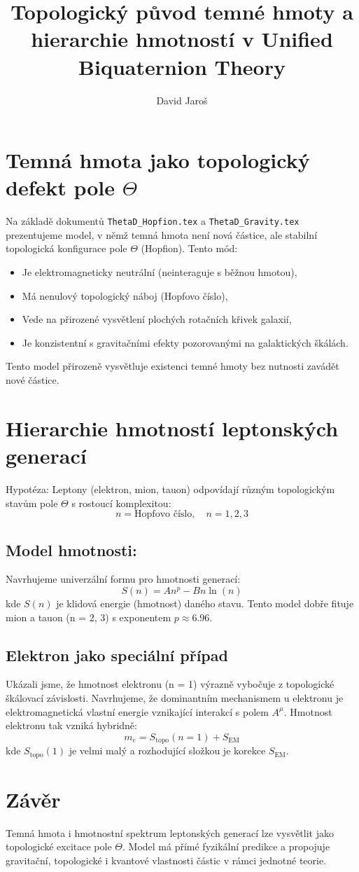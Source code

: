 \documentclass[12pt]{article}
\title{Topologický původ temné hmoty a hierarchie hmotností v Unified Biquaternion Theory}
\author{David Jaroš}
\date{}
\begin{document}
\maketitle

\section*{Temná hmota jako topologický defekt pole $\Theta$}
Na základě dokumentů \texttt{ThetaD\_Hopfion.tex} a \texttt{ThetaD\_Gravity.tex} prezentujeme model, v němž temná hmota není nová částice, ale stabilní topologická konfigurace pole $\Theta$ (Hopfion). Tento mód:
\begin{itemize}
    \item Je elektromagneticky neutrální (neinteraguje s běžnou hmotou),
    \item Má nenulový topologický náboj (Hopfovo číslo),
    \item Vede na přirozené vysvětlení plochých rotačních křivek galaxií,
    \item Je konzistentní s gravitačními efekty pozorovanými na galaktických škálách.
\end{itemize}
Tento model přirozeně vysvětluje existenci temné hmoty bez nutnosti zavádět nové částice.

\section*{Hierarchie hmotností leptonských generací}
Hypotéza: Leptony (elektron, mion, tauon) odpovídají různým topologickým stavům pole $\Theta$ s rostoucí komplexitou:
\[
n = \text{Hopfovo číslo}, \quad n = 1, 2, 3
\]

\subsection*{Model hmotnosti:}
Navrhujeme univerzální formu pro hmotnosti generací:
\[
S(n) = A n^p - B n \ln(n)
\]
kde $S(n)$ je klidová energie (hmotnost) daného stavu. Tento model dobře fituje mion a tauon (n = 2, 3) s exponentem $p \approx 6.96$.

\subsection*{Elektron jako speciální případ}
Ukázali jsme, že hmotnost elektronu (n = 1) výrazně vybočuje z topologické škálovací závislosti. Navrhujeme, že dominantním mechanismem u elektronu je elektromagnetická vlastní energie vznikající interakcí s polem $A^\mu$. Hmotnost elektronu tak vzniká hybridně:
\[
m_e = S_\text{topo}(n=1) + S_\text{EM}
\]
kde $S_\text{topo}(1)$ je velmi malý a rozhodující složkou je korekce $S_\text{EM}$.

\section*{Závěr}
Temná hmota i hmotnostní spektrum leptonských generací lze vysvětlit jako topologické excitace pole $\Theta$. Model má přímé fyzikální predikce a propojuje gravitační, topologické i kvantové vlastnosti částic v rámci jednotné teorie.
\end{document}
